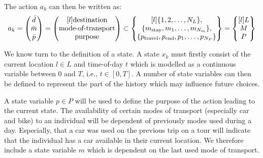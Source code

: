 The action $a_k$ can then be written as: 
\begin{equation} 
    a_k = \begin{pmatrix}
    \act{d} \\
    \act{m} \\
    \act{p}    
    \end{pmatrix} =
    \begin{pmatrix*}[l]
    \text{destination} \\
    \text{mode-of-transport} \\
    \text{purpose} \\
    \end{pmatrix*} 
    \subset
    \begin{Bmatrix*}[l]
    \{1,2,\dots, N_L\}, \\
    \{m_{\text{stay}},m_1,\dots,m_{N_m}\}, \\
    \{p_{\text{travel}},p_{\text{end}},p_1,\dots,p_{N_P}\} 
    \end{Bmatrix*}=
    \begin{Bmatrix*}[l]
    L \\
    M \\
    P \\
    \end{Bmatrix*}
\end{equation}

We know turn to the definition of a state. A state $x_k$ must firstly consist of the current location $l \in L$ and time-of-day $t$ which is modelled as a continuous variable between 0 and $T$, i.e., $t\in [0,T]$. A number of state variables can then be defined to represent the part of the history which may influence future choices. 

A state variable $p \in P$ will be used to define the purpose of the action leading to the current state. The availability of certain modes of transport (especially car and bike) to an individual will be dependent of previously modes used during a day. Especially, that a car was used on the previous trip on a tour will indicate that the individual has a car available in their current location. We therefore include a state variable $m$ which is dependent on the last used mode of transport. 

